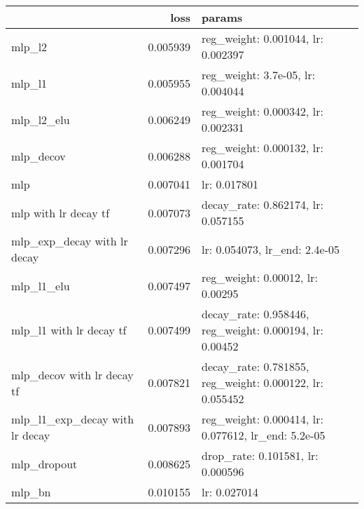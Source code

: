 \begin{tabular}{lrl}
\toprule
{} &      loss &                                                    params \\
\midrule
mlp\_l2                         &  0.005939 &                        reg\_weight: 0.001044, lr: 0.002397 \\
mlp\_l1                         &  0.005955 &                         reg\_weight: 3.7e-05, lr: 0.004044 \\
mlp\_l2\_elu                     &  0.006249 &                        reg\_weight: 0.000342, lr: 0.002331 \\
mlp\_decov                      &  0.006288 &                        reg\_weight: 0.000132, lr: 0.001704 \\
mlp                            &  0.007041 &                                              lr: 0.017801 \\
mlp with lr decay tf           &  0.007073 &                        decay\_rate: 0.862174, lr: 0.057155 \\
mlp\_exp\_decay with lr decay    &  0.007296 &                             lr: 0.054073, lr\_end: 2.4e-05 \\
mlp\_l1\_elu                     &  0.007497 &                          reg\_weight: 0.00012, lr: 0.00295 \\
mlp\_l1 with lr decay tf        &  0.007499 &   decay\_rate: 0.958446, reg\_weight: 0.000194, lr: 0.00452 \\
mlp\_decov with lr decay tf     &  0.007821 &  decay\_rate: 0.781855, reg\_weight: 0.000122, lr: 0.055452 \\
mlp\_l1\_exp\_decay with lr decay &  0.007893 &       reg\_weight: 0.000414, lr: 0.077612, lr\_end: 5.2e-05 \\
mlp\_dropout                    &  0.008625 &                         drop\_rate: 0.101581, lr: 0.000596 \\
mlp\_bn                         &  0.010155 &                                              lr: 0.027014 \\
\bottomrule
\end{tabular}
